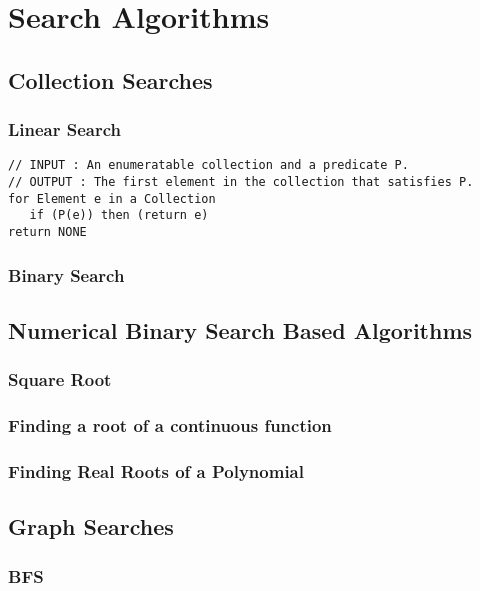 \documentclass[12pt, letterpaper]{book}
\begin{document}
	\chapter{Search Algorithms}

	\section{Collection Searches}
		\subsection{Linear Search} \label{linear search}

\begin{verbatim}
// INPUT : An enumeratable collection and a predicate P.
// OUTPUT : The first element in the collection that satisfies P.
for Element e in a Collection
   if (P(e)) then (return e)
return NONE
\end{verbatim}

		\subsection{Binary Search} \label{binary search}

	\section{Numerical Binary Search Based Algorithms}

	\subsection{Square Root}

	\subsection{Finding a root of a continuous function}

	\subsection{Finding Real Roots of a Polynomial}

	\section{Graph Searches}
		\subsection{BFS}
\end{document}
